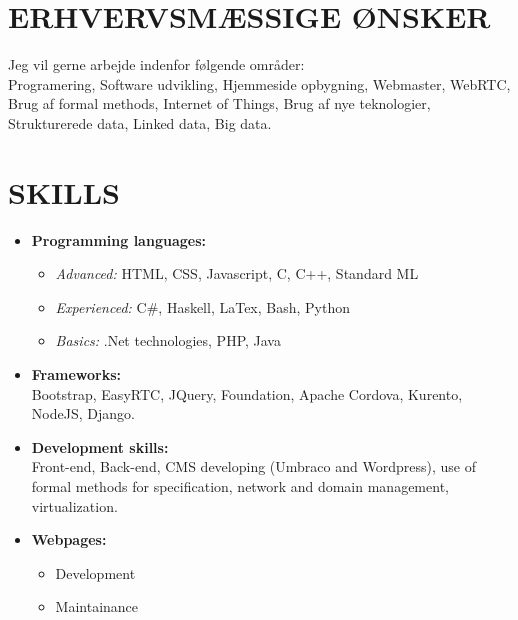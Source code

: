 \documentclass[11pt,a4paper,sans]{moderncv}        %
\begin{document}
\section{ERHVERVSMÆSSIGE ØNSKER}
Jeg vil gerne arbejde indenfor følgende områder:\\
Programering, Software udvikling, Hjemmeside opbygning, Webmaster, WebRTC, Brug af formal methods, Internet of Things, Brug af nye teknologier, Strukturerede data, Linked data, Big data.
\fi

\ifenglish
\section{SKILLS}
\begin{itemize}
\item \textbf{Programming languages:}
\begin{itemize}
\item \textit{Advanced:} HTML, CSS, Javascript, C, C++, Standard ML
\item \textit{Experienced:} C\#, Haskell, LaTex, Bash, Python
\item \textit{Basics:} .Net technologies, PHP, Java
\end{itemize}
\bigskip

\item \textbf{Frameworks:}\\
Bootstrap, EasyRTC, JQuery, Foundation, Apache Cordova, Kurento, NodeJS, Django.
\bigskip

\item \textbf{Development skills:}\\
Front-end, Back-end, CMS developing (Umbraco and Wordpress), use of formal methods for specification, network and domain management, virtualization.
\clearpage

\item \textbf{Webpages:}
\begin{itemize}
\item Development
\item Maintainance
\end{itemize}
\end{itemize}
\else
\end{document}
